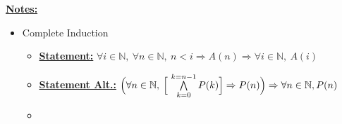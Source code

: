 \documentclass[12pt]{article}
\begin{document}
\begin{itemize}














    \bigskip

    \underline{\textbf{Notes:}}

    \bigskip

    \begin{itemize}
        \item Complete Induction
        \begin{itemize}
            \item \underline{\textbf{Statement:}} $\forall i \in \mathbb{N},\:\forall n \in \mathbb{N},\:n < i \Rightarrow A(n) \Rightarrow \forall i \in \mathbb{N},\:A(i)$
            \item \underline{\textbf{Statement Alt.:}} $\Bigl(\forall n \in \mathbb{N},\:\Bigl[ \ \bigwedge\limits_{k = 0}^{k=n-1} P(k) \Bigr] \Rightarrow P(n) \Bigr) \Rightarrow \forall n \in \mathbb{N}, P(n)$
            \item


\end{itemize}
\end{itemize}
\end{itemize}
\end{document}
